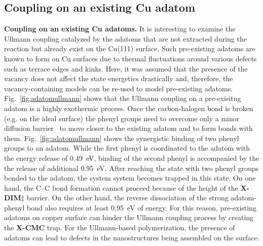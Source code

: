 \documentclass[journal=jacsat,manuscript=article]{achemso}
\newcommand{\lock}{\color{red}}
\newcommand{\lock}{\color{black}}
\begin{document}

\ifdefined\INTERNAL
\subsection{Coupling on an existing Cu adatom}
\fi

{\lock


\textbf{Coupling on an existing Cu adatoms.} It is interesting to examine the Ullmann coupling catalyzed by the adatoms that are not extracted during the reaction but already exist on the Cu(111) surface. Such pre-existing adatoms are known to form on Cu surfaces due to thermal fluctuations around various defects such as terrace edges and kinks. Here, it was assumed that the presence of the vacancy does not affect the state energetics drastically and, therefore, the vacancy-containing models can be re-used to model pre-existing adatoms. Fig.~\ref{fig:adatomullmann} shows that the Ullmann coupling on a pre-exisitng adatom is a highly exothermic process. Once the carbon-halogen bond is broken (e.g. on the ideal surface) the phenyl groups need to overcome only a minor diffusion barrier~\cite{pccp2010} to move closer to the existing adatom and to form bonds with them. 
%
%
Fig.~\ref{fig:adatomullmann} shows the synergistic binding of two phenyl groups to an adatom. While the first phenyl is coordinated to the adatom with the energy release of \SI{0.49}{\electronvolt}, binding of the second phenyl is accompanied by the the release of additional \SI{0.95}{\electronvolt}. 
%
After reaching the state with two phenyl groups bonded to the adatom, the system system becomes trapped in this state. On one hand, the C--C bond formation cannot proceed because of the height of the \textbf{X-DIM$\ddagger$} barrier. On the other hand, the reverse dissociation of the strong adatom-phenyl bond also requires at least \SI{0.95}{\electronvolt} of energy. For this reason, pre-existing adatoms on copper surface can hinder the Ullmann coupling process by creating the \textbf{X-CMC} trap. For the Ullmann-based polymerization, the presence of adatoms can lead to defects in the nanostructures being assembled on the surface.

}
\end{document}
